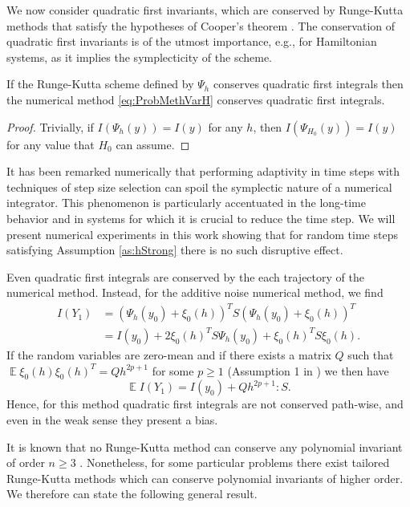 \documentclass{siamart1116}
\numberwithin{theorem}{section}
\newcommand{\E}{\operatorname{\mathbb{E}}}
\begin{document}
We now consider quadratic first invariants, which are conserved by Runge-Kutta methods that satisfy the hypotheses of Cooper's theorem \cite{HLW06}. The conservation of quadratic first invariants is of the utmost importance, e.g., for Hamiltonian systems, as it implies the symplecticity of the scheme. 
\begin{theorem}\label{thm:QuadraticInvariants} If the Runge-Kutta scheme defined by $\Psi_h$ conserves quadratic first integrals then the numerical method \eqref{eq:ProbMethVarH} conserves quadratic first integrals.
\end{theorem}
\begin{proof} Trivially, if $I(\Psi_h(y)) = I(y)$ for any $h$, then $I(\Psi_{H_0}(y)) = I(y)$ for any value that $H_0$ can assume.
\end{proof}
\begin{remark} It has been remarked numerically \cite{Hai97} that performing adaptivity in time steps with techniques of step size selection can spoil the symplectic nature of a numerical integrator. This phenomenon is particularly accentuated in the long-time behavior and in systems for which it is crucial to reduce the time step. We will present numerical experiments in this work showing that for random time steps satisfying Assumption \ref{as:hStrong} there is no such disruptive effect.
\end{remark}
\begin{remark}\label{rem:QuadraticInvariants} Even quadratic first integrals are conserved by the each trajectory of the numerical method. Instead, for the additive noise numerical method, we find
	\begin{equation}
	\begin{aligned}
		I(Y_1) &= (\Psi_h(y_0) + \xi_0(h))^T S (\Psi_h(y_0) + \xi_0(h))^T \\
		&= I(y_0) + 2\xi_0(h)^T S  \Psi_h(y_0) + \xi_0(h)^T S \xi_0(h).
	\end{aligned}
	\end{equation}
	If the random variables are zero-mean and if there exists a matrix $Q$ such that $\E\xi_0(h)\xi_0(h)^T = Qh^{2p + 1}$ for some $p \geq 1$ (Assumption 1 in \cite{CGS16}) we then have
	\begin{equation}
		\E I(Y_1) = I(y_0) + Q h^{2p + 1} : S.
	\end{equation}
	Hence, for this method quadratic first integrals are not conserved path-wise, and even in the weak sense they present a bias.
\end{remark}
It is known that no Runge-Kutta method can conserve any polynomial invariant of order $n \geq 3$ \cite{HLW06}. Nonetheless, for some particular problems there exist tailored Runge-Kutta methods which can conserve polynomial invariants of higher order. We therefore can state the following general result.
\end{document}
